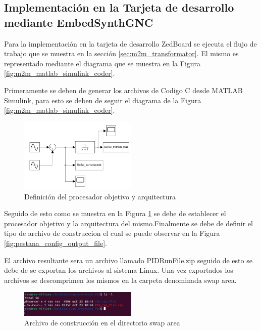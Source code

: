 \subsection{Implementación en la Tarjeta de desarrollo mediante EmbedSynthGNC}

Para la implementación en la tarjeta de desarrollo ZedBoard se ejecuta el flujo de trabajo que se muestra en la sección \ref{sec:m2m_transformator}. El mismo es representado mediante el diagrama que se muestra en la Figura \ref{fig:m2m_matlab_simulink_coder}.

Primeramente se deben de generar los archivos de Codigo C desde MATLAB Simulink, para esto se deben de seguir el diagrama de la Figura \ref{fig:m2m_matlab_simulink_coder}. 

\begin{figure}[h!]
    \centering
    \includegraphics[width=0.5\textwidth]{fig/especifico_2/CASO_ESTUDIO_FILTRO/Diagrama matlab simulink scope.pdf}
    \caption{Definición del procesador objetivo y arquitectura}
    \label{fig:system_target_PID}
\end{figure}

Seguido de esto como se muestra en la Figura \ref{fig:system_target_PID} se debe de establecer el procesador objetivo y la arquitectura del mismo.Finalmente se debe de definir el tipo de archivo de construccion el cual se puede observar en la Figura \ref{fig:pestana_config_output_file}. 

El archivo resultante sera un archivo llamado PIDRunFile.zip seguido de esto se debe de  se exportan los archivos al sistema Linux. Una vez exportados los archivos se descomprimen los mismos en la carpeta denominada swap area.

\begin{figure}[h!]
    \centering
    \includegraphics[width=0.5\textwidth]{fig/Capitulo5/Caso_de_estudio_PID/retornos_consola/Screenshot from 2024-10-31 20-21-37.png}
    \caption{Archivo de construcción en el directorio swap area}
    \label{fig:swap_area_PID}
\end{figure}


